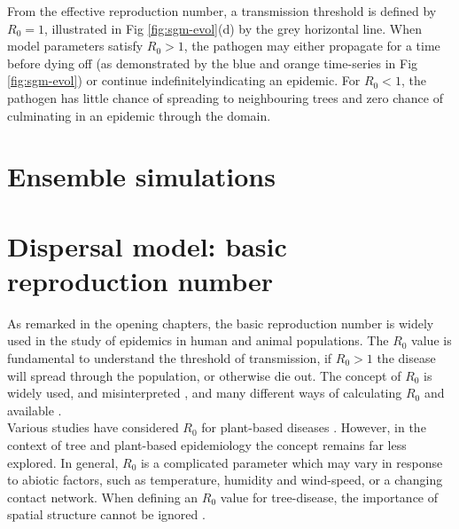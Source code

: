 From the effective reproduction number, a transmission threshold is defined by $R_0=1$, illustrated in Fig \ref{fig:sgm-evol}(d) by the grey horizontal line. When model parameters satisfy $R_0>1$, the pathogen may either propagate for a time before dying off (as demonstrated by the blue and orange time-series in Fig \ref{fig:sgm-evol}) or continue indefinitely\textemdash indicating an epidemic. For $R_0<1$, the pathogen has little chance of spreading to neighbouring trees and zero chance of culminating in an epidemic through the domain\protect\footnotemark {}.\\

\section{Ensemble simulations}

\blindtext


\section{Dispersal model: basic reproduction number}


As remarked in the opening chapters, the basic reproduction number is widely used in the %
study of epidemics in human and animal populations. %
The $R_0$ value is fundamental to understand the threshold of transmission, if $R_0>1$ the %
disease will spread through the population, or otherwise die out. The concept of $R_0$ is %
widely used, and misinterpreted \cite{delamater2019complexity}, and many different ways of %
calculating $R_0$ and available \cite{perspectives-on-r0}.\\

Various studies have considered $R_0$ for plant-based diseases %
\cite{gubbins2000population, park2001invasion, doi:10.1146/annurev.phyto.011108.135838, van2011periodic, mikaberidze2016invasiveness}. %
However, in the context of tree and plant-based epidemiology the concept remains far less %
explored. In general, $R_0$ is a complicated parameter which may vary in response to abiotic %
factors, such as temperature, humidity and wind-speed, or a changing contact network. %
When defining an $R_0$ value for tree-disease, the importance of spatial structure cannot be %
ignored \cite{park2001invasion}.\\

